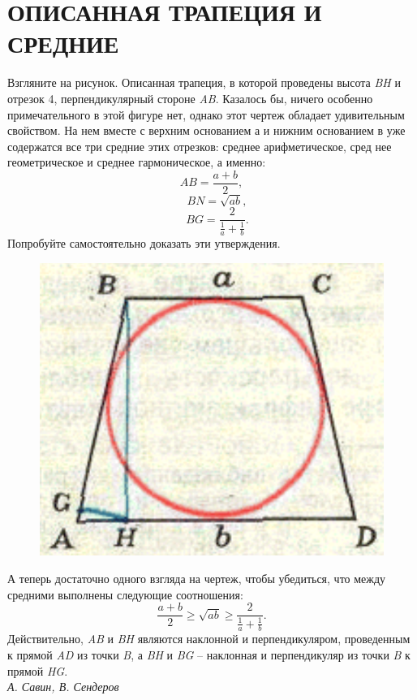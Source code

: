\begin{minipage}{0.3\textwidth} %
    \titleformat{\section}{\filcenter\Large\bfseries}{}{}{}
    \section*{ОПИСАННАЯ ТРАПЕЦИЯ И СРЕДНИЕ}
    Взгляните на рисунок. Описанная трапеция, в которой проведены высота \textit{BH} и отрезок 4, перпендикулярный стороне \textit{AB}. Казалось бы, ничего особенно примечательного в этой фигуре нет, однако этот чертеж обладает удивительным свойством. На нем вместе с верхним основанием а и нижним основанием в уже содержатся все три средние этих отрезков: среднее арифметическое, сред нее геометрическое и среднее гармоническое, а именно:\[AB = \frac{a+b}{2},\] \[\quad BN = \sqrt{ab},\] \[\quad BG = \frac{2}{\frac{1}{a}+\frac{1}{b}}.\]
    Попробуйте самостоятельно доказать эти утверждения.
    \begin{figure}[H]
        \setcounter{figure}{13}
        \centering
        \includegraphics[width=1\columnwidth]{img/2.png}
    \end{figure}
    А теперь достаточно одного взгляда на чертеж, чтобы убедиться, что между средними выполнены следующие соотношения:
    \[ \frac{a+b}{2} \geq \sqrt{ab} \geq \frac{2}{\frac{1}{a}+\frac{1}{b}}.\]
    Действительно, \textit{AB} и \textit{BH} являются наклонной и перпендикуляром, проведенным к прямой \textit{AD} из точки \textit{B}, а \textit{BH} и \textit{BG} -- наклонная и перпендикуляр из точки \textit{B} к прямой \textit{HG}.\\
    
    {\textit{А. Савин, В. Сендеров}}\raggedleft
\end{minipage}
